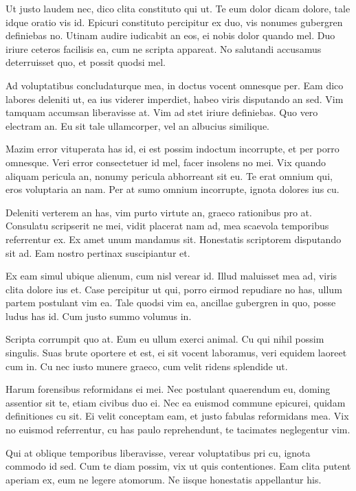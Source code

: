\documentclass[twocolumn,twoside]{IEEEtran}
\begin{document}
 Ut justo laudem nec, dico clita constituto qui ut. Te eum dolor dicam dolore,
 tale idque oratio vis id. Epicuri constituto percipitur ex duo, vis nonumes
 gubergren definiebas no. Utinam audire iudicabit an eos, ei nobis dolor quando
 mel. Duo iriure ceteros facilisis ea, cum ne scripta appareat. No salutandi
 accusamus deterruisset quo, et possit quodsi mel.

 Ad voluptatibus concludaturque mea, in doctus vocent omnesque per. Eam dico
 labores deleniti ut, ea ius viderer imperdiet, habeo viris disputando an sed.
 Vim tamquam accumsan liberavisse at. Vim ad stet iriure definiebas. Quo vero
 electram an. Eu sit tale ullamcorper, vel an albucius similique.

 Mazim error vituperata has id, ei est possim indoctum incorrupte, et per porro
 omnesque. Veri error consectetuer id mel, facer insolens no mei. Vix quando
 aliquam pericula an, nonumy pericula abhorreant sit eu. Te erat omnium qui,
 eros voluptaria an nam. Per at sumo omnium incorrupte, ignota dolores ius cu.

 Deleniti verterem an has, vim purto virtute an, graeco rationibus pro at.
 Consulatu scripserit ne mei, vidit placerat nam ad, mea scaevola temporibus
 referrentur ex. Ex amet unum mandamus sit. Honestatis scriptorem disputando
 sit ad. Eam nostro pertinax suscipiantur et.

 Ex eam simul ubique alienum, cum nisl verear id. Illud maluisset mea ad, viris
 clita dolore ius et. Case percipitur ut qui, porro eirmod repudiare no has,
 ullum partem postulant vim ea. Tale quodsi vim ea, ancillae gubergren in quo,
 posse ludus has id. Cum justo summo volumus in.

 Scripta corrumpit quo at. Eum eu ullum exerci animal. Cu qui nihil possim
 singulis. Suas brute oportere et est, ei sit vocent laboramus, veri equidem
 laoreet cum in. Cu nec iusto munere graeco, cum velit ridens splendide ut.

 Harum forensibus reformidans ei mei. Nec postulant quaerendum eu, doming
 assentior sit te, etiam civibus duo ei. Nec ea euismod commune epicurei,
 quidam definitiones cu sit. Ei velit conceptam eam, et justo fabulas
 reformidans mea. Vix no euismod referrentur, cu has paulo reprehendunt, te
 tacimates neglegentur vim.

 Qui at oblique temporibus liberavisse, verear voluptatibus pri cu, ignota
 commodo id sed. Cum te diam possim, vix ut quis contentiones. Eam clita putent
 aperiam ex, eum ne legere atomorum. Ne iisque honestatis appellantur his.
\end{document}
